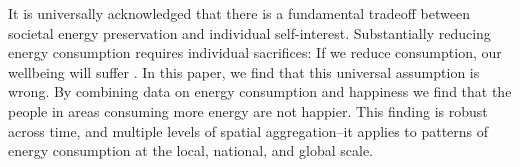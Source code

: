 \documentclass[10pt, letterpaper]{article}
\begin{document}
\begin{spacing}{1.0}
It is universally acknowledged that there is a fundamental tradeoff between
societal energy preservation and individual self-interest. Substantially reducing
energy consumption requires individual sacrifices: If we reduce consumption, our
wellbeing will 
suffer \citep{gordon_wsj_may_29_14, dietz15, carter_pbs_apr_18_77,smil05}. %
%
%
%
%
%
In this paper, we find that this universal assumption is wrong.  By combining
data on energy consumption and happiness we find that the
 people in areas consuming more energy are not happier.
This finding is robust across time, and multiple levels of spatial aggregation--it applies to patterns of energy consumption  at the local, national, and global scale.  



\end{spacing}
\end{document}
